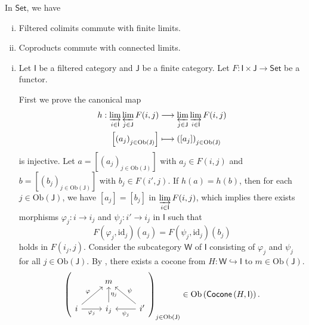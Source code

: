 \begin{proposition}{}{}
    In $\mathsf{Set}$, we have
    \begin{enumerate}[(i)]
        \item Filtered colimits commute with finite limits.
        \item Coproducts commute with connected limits.
    \end{enumerate}
\end{proposition}
\begin{prf}
    \begin{enumerate}[(i)]
        \item Let $\mathsf{I}$ be a filtered category and $\mathsf{J}$ be a finite category. Let $F:\mathsf{I}\times \mathsf{J}\to \mathsf{Set}$ be a functor. 

        First we prove the canonical map
        \begin{align*}
            h:\varinjlim_{i\in\mathsf{I}}\varprojlim_{j\in\mathsf{J}} F(i,j)&\longrightarrow \varprojlim_{j\in\mathsf{J}}\varinjlim_{i\in\mathsf{I}} F(i,j)\\
            \left[\left(a_j\right)_{j\in\mathrm{Ob}(\mathsf{J})}\right]&\longmapsto \left(\left[a_j\right]\right)_{j\in\mathrm{Ob}(\mathsf{J})}
        \end{align*}
        is injective. Let $a=\left[\left(a_j\right)_{j\in\mathrm{Ob}(\mathsf{J})}\right]$ with $a_j\in F(i,j)$ and $b=\left[\left(b_j\right)_{j\in\mathrm{Ob}(\mathsf{J})}\right]$ with $b_j\in F(i',j)$. If $h(a)=h(b)$, then for each $j\in \mathrm{Ob}(\mathsf{J})$, we have $[a_j]=[b_j]$ in $\varinjlim\limits_{i\in\mathsf{I}} F(i,j)$, which implies there exists morphisms $\varphi_j:i\to i_j$ and $\psi_j:i'\to i_j$ in $\mathsf{I}$ such that 
        \[
        F(\varphi_j,\mathrm{id}_j)(a_j)=F(\psi_j,\mathrm{id}_j)(b_j)
        \]
        holds in $F(i_j,j)$. Consider the subcategory $\mathsf{W}$ of $\mathsf{I}$ consisting of $\varphi_j$ and $\psi_j$ for all $j\in \mathrm{Ob}(\mathsf{J})$. By , there exists a cocone from $H:\mathsf{W}\hookrightarrow \mathsf{I}$ to $m\in \mathrm{Ob}(\mathsf{J})$.
        \[
            \left( \begin{tikzcd}
                & m                       &                                            \\
i \arrow[r, "\varphi_j"'] \arrow[ru, "\varphi"] & i_j \arrow[u, "\eta_j"'] & i' \arrow[l, "\psi_j"] \arrow[lu, "\psi"']
\end{tikzcd}\right)_{j\in \mathrm{Ob}(\mathsf{J})}\in \mathrm{Ob}\left(\mathsf{Cocone}\left(H,\mathsf{I} \right)\right).
\]
\end{enumerate}
\end{prf}
